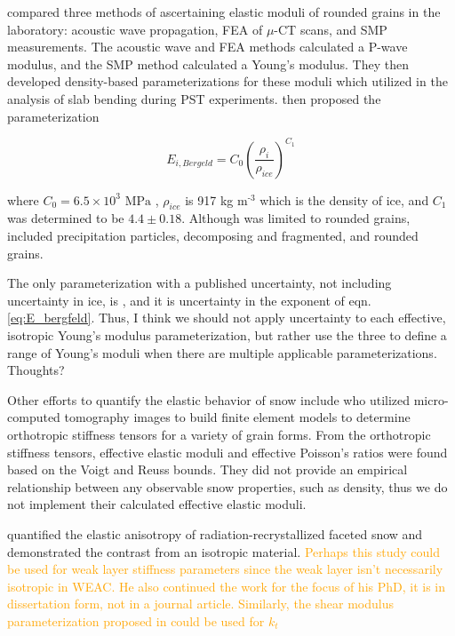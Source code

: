 \documentclass[journal abbreviation, manuscript]{copernicus}
\begin{document}
\citet{gerling2017measuring} compared three methods of ascertaining elastic moduli of rounded grains in the laboratory: acoustic wave propagation, FEA of $\mu$-CT scans, and SMP measurements. The acoustic wave and FEA methods calculated a P-wave modulus, and the SMP method calculated a Young's modulus. They then developed density-based parameterizations for these moduli which \citet{bergfeld2023} utilized in the analysis of slab bending during PST experiments. \citet{bergfeld2023} then proposed the parameterization

\begin{equation}\label{eq:E_bergfeld}
    E_{i, Bergeld} = C_0  (\frac{\rho_i}{\rho_{ice}})^{C_1} 
\end{equation}

\noindent where $C_0 = 6.5 \times 10^3  \text{ MPa }$, $\rho_{ice}$ is 917 kg $\text{m}^\text{-3}$ which is the density of ice, and $C_1$ was determined to be $4.4 \pm 0.18$. Although \citet{gerling2017measuring} was limited to rounded grains, \citet{bergfeld2023} included precipitation particles, decomposing and fragmented, and rounded grains.

\textcolor{RubineRed}{The only parameterization with a published uncertainty, not including uncertainty in ice, is \citet{bergfeld2023}, and it is uncertainty in the exponent of eqn. \ref{eq:E_bergfeld}. Thus, I think we should not apply uncertainty to each effective, isotropic Young's modulus parameterization, but rather use the three to define a range of Young's moduli when there are multiple applicable parameterizations. Thoughts?}


Other efforts to quantify the elastic behavior of snow include \citet{srivastava2016} who utilized micro-computed tomography images to build finite element models to determine orthotropic stiffness tensors for a variety of grain forms. From the orthotropic stiffness tensors, effective elastic moduli and effective Poisson's ratios were found based on the Voigt and Reuss bounds. They did not provide an empirical relationship between any observable snow properties, such as density, thus we do not implement their calculated effective elastic moduli.

\citet{walters2014} quantified the elastic anisotropy of radiation-recrystallized faceted snow and demonstrated the contrast from an isotropic material. \textcolor{Orange}{Perhaps this study could be used for weak layer stiffness parameters since the weak layer isn't necessarily isotropic in WEAC. He also continued the work for the focus of his PhD, it is in dissertation form, not in a journal article. Similarly, the shear modulus parameterization proposed in \citet{wautier2015} could be used for $k_t$}
\end{document}
